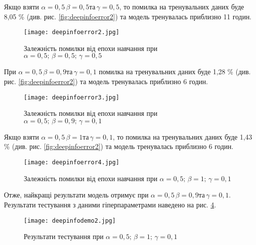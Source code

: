 Якщо взяти $\alpha = 0,5 \, \beta = 0,5 \text{та} \, \gamma = 0,5$, то помилка на тренувальних даних буде 8,05 \% (див. рис. \ref{fig:deepinfoerror2}) та модель тренувалась приблизно 11 годин.

\vspace{1em}

\begin{figure}[h]
  \texttt{[image: deepinfoerror2.jpg]}
  \caption{Залежність помилки від епохи навчання при $\alpha = 0,5; \, \beta = 0,5; \, \gamma = 0,5$}
  \label{fig:deepinfoerror1}
\end{figure}

При $\alpha = 0,5 \, \beta = 0,9 \text{та} \, \gamma = 0,1$ помилка на тренувальних даних буде 1,28 \% (див. рис. \ref{fig:deepinfoerror2}) та модель тренувалась приблизно 6 годин.

\vspace{1em}

\begin{figure}[h]
  \texttt{[image: deepinfoerror3.jpg]}
  \caption{Залежність помилки від епохи навчання при $\alpha = 0,5; \, \beta = 0,9; \, \gamma = 0,1$}
  \label{fig:deepinfoerror1}
\end{figure}

Якщо взяти $\alpha = 0,5 \, \beta = 1 \text{та} \, \gamma = 0,1$, то помилка на тренувальних даних буде 1,43 \% (див. рис. \ref{fig:deepinfoerror2}) та модель тренувалась приблизно 6 годин.

\vspace{1em}

\begin{figure}[h]
  \texttt{[image: deepinfoerror4.jpg]}
  \caption{Залежність помилки від епохи навчання при $\alpha = 0,5; \, \beta = 1; \, \gamma = 0,1$}
  \label{fig:deepinfoerror4}
\end{figure}

Отже, найкращі результати модель отримує при $\alpha = 0,5 \, \beta = 0,9 \text{та} \, \gamma = 0,1$. Результати тестування з даними гіперпараметрами наведено на рис. \ref{fig:deepinfodemo2}.

\vspace{1em}

\begin{figure}[h]
  \texttt{[image: deepinfodemo2.jpg]}
  \caption{Результати тестування при $\alpha = 0,5; \, \beta = 1; \, \gamma = 0,1$}
  \label{fig:deepinfodemo2}
\end{figure}

